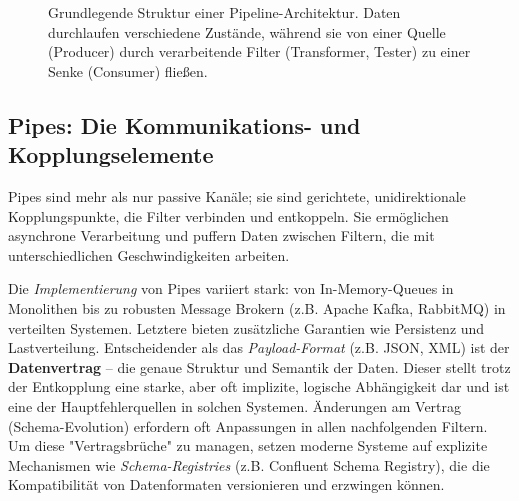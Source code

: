\documentclass[10pt,a4paper]{article}
\begin{document}
\begin{figure}[h!]
\centering
{}
\caption{Grundlegende Struktur einer Pipeline-Architektur. Daten durchlaufen verschiedene Zustände, während sie von einer Quelle (Producer) durch verarbeitende Filter (Transformer, Tester) zu einer Senke (Consumer) fließen.}
\label{fig:core_architecture}
\end{figure}

\subsection{Pipes: Die Kommunikations- und Kopplungselemente}
Pipes sind mehr als nur passive Kanäle; sie sind gerichtete, unidirektionale Kopplungspunkte, die Filter verbinden und entkoppeln.\cite{oreilly_python_pipes} Sie ermöglichen asynchrone Verarbeitung und puffern Daten zwischen Filtern, die mit unterschiedlichen Geschwindigkeiten arbeiten.

Die \textit{Implementierung} von Pipes variiert stark: von In-Memory-Queues in Monolithen bis zu robusten Message Brokern (z.B. Apache Kafka, RabbitMQ) in verteilten Systemen. Letztere bieten zusätzliche Garantien wie Persistenz und Lastverteilung.\cite{richards2020} Entscheidender als das \textit{Payload-Format} (z.B. JSON, XML) ist der \textbf{Datenvertrag} – die genaue Struktur und Semantik der Daten. Dieser stellt trotz der Entkopplung eine starke, aber oft implizite, logische Abhängigkeit dar und ist eine der Hauptfehlerquellen in solchen Systemen. Änderungen am Vertrag (Schema-Evolution) erfordern oft Anpassungen in allen nachfolgenden Filtern. Um diese "Vertragsbrüche" zu managen, setzen moderne Systeme auf explizite Mechanismen wie \textit{Schema-Registries} (z.B. Confluent Schema Registry), die die Kompatibilität von Datenformaten versionieren und erzwingen können.
\end{document}
